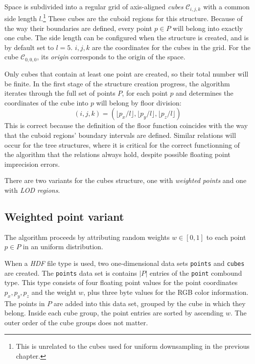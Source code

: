 \documentclass[a4paper,10pt,abstracton,notitlepage]{scrreprt}
\begin{document}
Space is subdivided into a regular grid of axis-aligned \emph{cubes} $\mathcal{C}_{i,j,k}$ with a common side length $l$.\footnote{This is unrelated to the cubes used for uniform downsampling in the previous chapter.} These cubes are the cuboid regions for this structure. Because of the way their boundaries are defined, every point $p \in P$ will belong into exactly one cube. The side length can be configured when the structure is created, and is by default set to $l = 5$. $i, j, k$ are the coordinates for the cubes in the grid. For the cube $\mathcal{C}_{0,0,0}$, its \emph{origin} corresponds to the origin of the space.

Only cubes that contain at least one point are created, so their total number will be finite. In the first stage of the structure creation progress, the algorithm iterates through the full set of points $P$, for each point $p$ and determines the coordinates of the cube into $p$ will belong by floor division:
\begin{equation*}
	(i, j, k) = \left( \lfloor p_{x}/l \rfloor, \lfloor p_{y}/l \rfloor, \lfloor p_{z}/l \rfloor \right)
\end{equation*}
This is correct because the definition of the floor function coincides with the way that the cuboid regions' boundary intervals are defined. Similar relations will occur for the tree structures, where it is critical for the correct functionning of the algorithm that the relations always hold, despite possible floating point imprecision errors.

There are two variants for the cubes structure, one with \emph{weighted points} and one with \emph{LOD regions}. 

\subsection{Weighted point variant}
The algorithm proceeds by attributing random weights $w \in [0,1]$ to each point $p \in P$ in an uniform distribution.

When a \emph{HDF} file type is used, two one-dimensional data sets \texttt{points} and \texttt{cubes} are created. The \texttt{points} data set is contains $|P|$ entries of the \texttt{point} combound type. This type consists of four floating point values for the point coordinates $p_{x}, p_{y}, p_{z}$ and the weight $w$, plus three byte values for the RGB color information. The points in $P$ are added into this data set, grouped by the cube in which they belong. Inside each cube group, the point entries are sorted by ascending $w$. The outer order of the cube groups does not matter.
\end{document}
